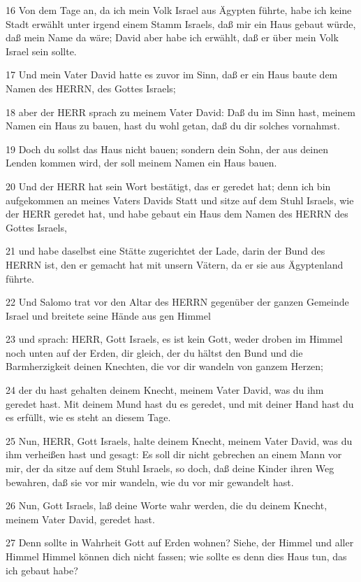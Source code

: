 \par 16 Von dem Tage an, da ich mein Volk Israel aus Ägypten führte, habe ich keine Stadt erwählt unter irgend einem Stamm Israels, daß mir ein Haus gebaut würde, daß mein Name da wäre; David aber habe ich erwählt, daß er über mein Volk Israel sein sollte.
\par 17 Und mein Vater David hatte es zuvor im Sinn, daß er ein Haus baute dem Namen des HERRN, des Gottes Israels;
\par 18 aber der HERR sprach zu meinem Vater David: Daß du im Sinn hast, meinem Namen ein Haus zu bauen, hast du wohl getan, daß du dir solches vornahmst.
\par 19 Doch du sollst das Haus nicht bauen; sondern dein Sohn, der aus deinen Lenden kommen wird, der soll meinem Namen ein Haus bauen.
\par 20 Und der HERR hat sein Wort bestätigt, das er geredet hat; denn ich bin aufgekommen an meines Vaters Davids Statt und sitze auf dem Stuhl Israels, wie der HERR geredet hat, und habe gebaut ein Haus dem Namen des HERRN des Gottes Israels,
\par 21 und habe daselbst eine Stätte zugerichtet der Lade, darin der Bund des HERRN ist, den er gemacht hat mit unsern Vätern, da er sie aus Ägyptenland führte.
\par 22 Und Salomo trat vor den Altar des HERRN gegenüber der ganzen Gemeinde Israel und breitete seine Hände aus gen Himmel
\par 23 und sprach: HERR, Gott Israels, es ist kein Gott, weder droben im Himmel noch unten auf der Erden, dir gleich, der du hältst den Bund und die Barmherzigkeit deinen Knechten, die vor dir wandeln von ganzem Herzen;
\par 24 der du hast gehalten deinem Knecht, meinem Vater David, was du ihm geredet hast. Mit deinem Mund hast du es geredet, und mit deiner Hand hast du es erfüllt, wie es steht an diesem Tage.
\par 25 Nun, HERR, Gott Israels, halte deinem Knecht, meinem Vater David, was du ihm verheißen hast und gesagt: Es soll dir nicht gebrechen an einem Mann vor mir, der da sitze auf dem Stuhl Israels, so doch, daß deine Kinder ihren Weg bewahren, daß sie vor mir wandeln, wie du vor mir gewandelt hast.
\par 26 Nun, Gott Israels, laß deine Worte wahr werden, die du deinem Knecht, meinem Vater David, geredet hast.
\par 27 Denn sollte in Wahrheit Gott auf Erden wohnen? Siehe, der Himmel und aller Himmel Himmel können dich nicht fassen; wie sollte es denn dies Haus tun, das ich gebaut habe?
